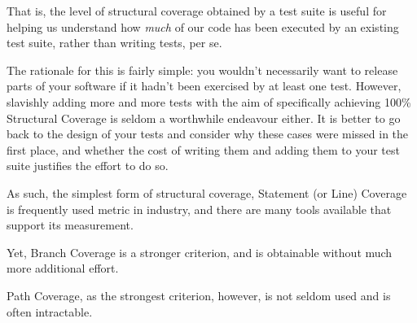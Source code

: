 That is, the level of structural coverage obtained by a test suite is useful for
helping us understand how {\it much} of our code has been executed by an
existing test suite, rather than writing tests, per se.


The rationale for this is fairly simple: you wouldn't necessarily want to
release parts of your software if it hadn't been exercised by at least one test.
However, slavishly adding more and more tests with the aim of specifically
achieving 100\% Structural Coverage is seldom a worthwhile endeavour either. It
is better to go back to the design of your tests and consider why these cases
were missed in the first place, and whether the cost of writing them and adding
them to your test suite justifies the effort to do so.


As such, the simplest form of structural coverage, Statement (or Line) Coverage
is frequently used metric in industry, and there are many tools available that
support its measurement. 


Yet, Branch Coverage is a stronger criterion, and is obtainable without much
more additional effort. 


Path Coverage, as the strongest criterion, however, is not seldom used and is
often intractable.

